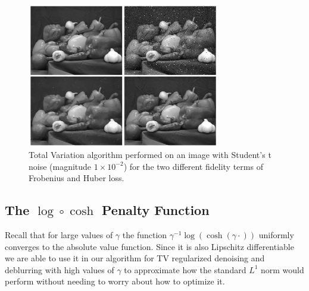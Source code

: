 \documentclass[10pt,a4paper]{article}
\begin{document}
	\begin{figure}[H]
		\begin{center}
			\includegraphics[width = 0.75\textwidth]{../figures/student-t_peppers.png} 
		\end{center}
		\caption{Total Variation algorithm performed on an image with Student's t noise (magnitude $1 \times 10^{-2}$) for the two different fidelity terms of Frobenius and Huber loss.}
		\label{tv_student}
	\end{figure}
	
	\subsection{The $\log \circ \cosh$ Penalty Function}
	
	Recall that for large values of $\gamma$ the function $\gamma^{-1} \log(\cosh (\gamma \cdot ))$ uniformly converges to the absolute value function.  Since it is also Lipschitz differentiable we are able to use it in our algorithm for TV regularized denoising and deblurring with high values of $\gamma$ to approximate how the standard $L^1$ norm would perform without needing to worry about how to optimize it.
	
\end{document}
